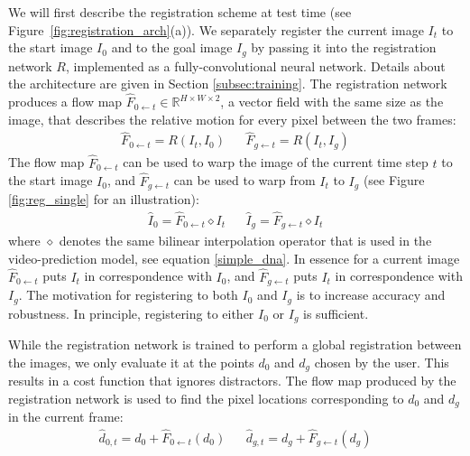 We will first describe the registration scheme at test time (see Figure~\ref{fig:registration_arch}(a)). We separately register the current image $I_t$ to the start image $I_0$ and to the goal image $I_g$ by passing it into the registration network $R$, implemented as a fully-convolutional neural network. Details about the architecture are given in Section \ref{subsec:training}. The registration network produces a flow map $\hat{F}_{0 \leftarrow t} \in \mathbb{R}^{H \times W \times 2}$, a vector field with the same size as the image, that describes the relative motion for every pixel between the two frames:
\begin{align}
\hat{F}_{0 \leftarrow t} = R(I_t, I_0) &&
\hat{F}_{g \leftarrow t} = R(I_t, I_g)
\end{align}
The flow map $\hat{F}_{0 \leftarrow t}$ can be used to warp the image of the current time step $t$ to the start image $I_0$, and $\hat{F}_{g \leftarrow t}$ can be used to warp from $I_t$ to $I_g$ (see Figure \ref{fig:reg_single} for an illustration):
\begin{align}
\hat{I}_0 = \hat{F}_{0 \leftarrow t} \diamond  I_t &&
\hat{I}_g = \hat{F}_{g \leftarrow t} \diamond  I_t 
\end{align}
where $\diamond$ denotes the same bilinear interpolation operator that is used in the video-prediction model, see equation \ref{simple_dna}. In essence for a current image $\hat{F}_{0 \leftarrow t}$ puts $I_t$ in correspondence with $I_0$, and $\hat{F}_{g \leftarrow t}$ puts $I_t$ in correspondence with $I_g$. The motivation for registering to both $I_0$ and $I_g$ is to increase accuracy and robustness. In principle, registering to either $I_0$ or $I_g$ is sufficient.

While the registration network is trained to perform a global registration between the images, we only evaluate it at the points $d_0$ and $d_g$ chosen by the user. This results in a cost function that ignores distractors. The flow map produced by the registration network is used to find the pixel locations corresponding to $d_0$ and $d_g$ in the current frame: 
\begin{align}
\hat{d}_{0,t} = d_0 + \hat{F}_{0 \leftarrow t}(d_0) &&
\hat{d}_{g,t} = d_g + \hat{F}_{g \leftarrow t}(d_g)
\label{eqn:warped_pos}
\end{align}


